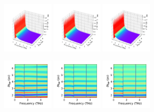 \documentclass[a4paper]{article}
\begin{document}
\begin{figure}[H]
  \centering
  \includegraphics[width=0.23\textwidth]{cond3d_imag-A1-v0-imp0.pdf}
  \includegraphics[width=0.23\textwidth]{cond3d_imag-A1-v1-imp0.pdf}
  \includegraphics[width=0.23\textwidth]{cond3d_imag-A1-v2-imp0.pdf}
\end{figure}
\begin{figure}[H]
  \centering
  \includegraphics[width=0.23\textwidth]{cond_pcolor-A1-v0-imp0.pdf}
  \includegraphics[width=0.23\textwidth]{cond_pcolor-A1-v1-imp0.pdf}
  \includegraphics[width=0.23\textwidth]{cond_pcolor-A1-v2-imp0.pdf}
\end{figure}
\end{document}
